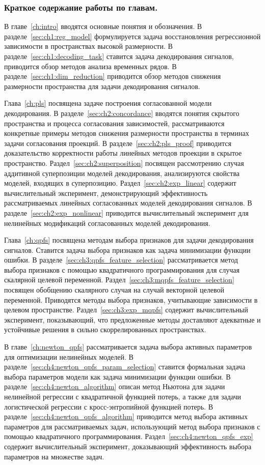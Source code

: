 \subsubsection{Краткое содержание работы по главам.}
В главе~\ref{ch:intro} вводятся основные понятия и обозначения. 
В разделе~\ref{sec:ch1:reg_model} формулируется задача восстановления регрессионной зависимости в пространствах высокой размерности.
В разделе~\ref{sec:ch1:decoding_task} ставится задача декодирования сигналов, приводится обзор методов анализа временных рядов.
В разделе~\ref{sec:ch1:dim_reduction} приводится обзор методов снижения размерности пространства для задачи декодирования сигналов.

Глава~\ref{ch:pls} посвящена задаче построения согласованной модели декодирования.
В разделе~\ref{sec:ch2:concordance} вводятся понятия скрытого пространства и процесса согласования зависимостей, рассматриваются конкретные примеры методов снижения размерности пространства в терминах задачи согласования проекций.
В разделе~\ref{sec:ch2:pls_proof} приводится доказательство корректности работы линейных методов проекции в скрытое пространство.
Раздел~\ref{sec:ch2:superposition} посвящен рассмотрению случая аддитивной суперпозиции моделей декодирования, анализируются свойства моделей, входящих в суперпозицию.
Раздел~\ref{sec:ch2:exp_linear} содержит вычислительный эксперимент, демонстрирующий эффективность рассматриваемых линейных согласованных моделей декодирования сигналов.
В разделе~\ref{sec:ch2:exp_nonlinear} приводится вычислительный эксперимент для нелинейных модификаций согласованных моделей декодирования.

Глава~\ref{ch:qpfs} посвящена методам выбора признаков для задачи декодирования сигналов. 
Ставится задача выбора признаков как задача минимизации функции ошибки.
В разделе~\ref{sec:ch3:qpfs_feature_selection} рассматривается метод выбора признаков с помощью квадратичного программирования для случая скалярной целевой переменной.
Раздел~\ref{sec:ch3:mqpfs_feature_selection} посвящен обобщению скалярного случая на случай векторной целевой переменной.
Приводятся методы выбора признаков, учитывающие зависимости в целевом пространстве.
Раздел~\ref{sec:ch3:exp_mqpfs} содержит вычислительный эксперимент, показывающий, что предложенные методы доставляют адекватные и устойчивые решения в сильно скоррелированных пространствах.

В главе~\ref{ch:newton_qpfs} рассматривается задача выбора активных параметров для оптимизации нелинейных моделей.
В разделе~\ref{sec:ch4:newton_qpfs_param_selection} ставится формальная задача выбора параметров модели как задача минимизации функции ошибки.
В разделе~\ref{sec:ch4:newton_algorithm} описан метод Ньютона для задачи нелинейной регрессии с квадратичной функцией потерь, а также для задачи логистической регрессии с кросс-энтропийной функцией потерь.
В разделе~\ref{sec:ch4:newton_qpfs_algorithm} приводится метод выбора активных параметров для рассматриваемых задач, использующий метод выбора признаков с помощью квадратичного программирования.
Раздел~\ref{sec:ch4:newton_qpfs_exp} содержит вычислительный эксперимент, доказывающий эффективность выбора параметров на множестве задач.


